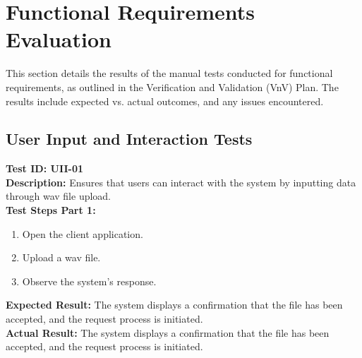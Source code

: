 \documentclass[12pt, titlepage]{article}
\begin{document}
\section{Functional Requirements Evaluation}
This section details the results of the manual tests conducted for functional
requirements, as outlined in the Verification and Validation (VnV) Plan. The
results include expected vs. actual outcomes, and any issues encountered.

\subsection{User Input and Interaction Tests}
\textbf{Test ID: UII-01}\\
\textbf{Description:} Ensures that users can interact with the system by inputting data through wav file upload.\\
\textbf{Test Steps Part 1:}
\begin{enumerate}
    \item Open the client application.
    \item Upload a wav file.
    \item Observe the system's response.
\end{enumerate}
\textbf{Expected Result:} The system displays a confirmation that the file has been accepted, and the request process is initiated.\\
\textbf{Actual Result:} The system displays a confirmation that the file has been accepted, and the request process is initiated.\\
\end{document}
